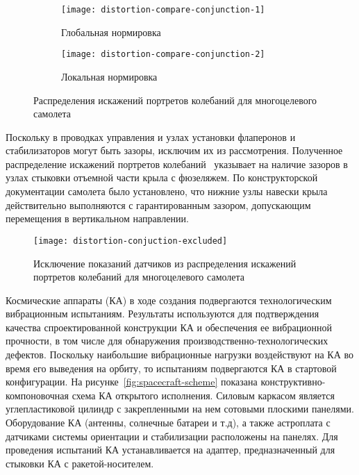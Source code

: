 \begin{figure}[!htb]
	\centerfloat
	\begin{subfigure}[t]{\sfDefects}
		\texttt{[image: distortion-compare-conjunction-1]} 
		\caption{Глобальная нормировка} \label{subfig:distortion-compare-conjunction-1}
	\end{subfigure}
	\hfill
	\begin{subfigure}[t]{\sfDefects}
		\texttt{[image: distortion-compare-conjunction-2]} 
		\caption{Локальная нормировка} \label{subfig:distortion-compare-conjunction-2}
	\end{subfigure}
    \caption{Распределения искажений портретов колебаний для многоцелевого самолета} \label{fig:distortion-compare-conjunction}
\end{figure}

Поскольку в проводках управления и узлах установки флаперонов и стабилизаторов могут быть зазоры, исключим их из рассмотрения. Полученное распределение искажений портретов колебаний~ указывает на наличие зазоров в узлах стыковки отъемной части крыла с фюзеляжем. По конструкторской документации самолета было установлено, что нижние узлы навески крыла действительно выполняются с гарантированным зазором, допускающим перемещения в вертикальном направлении.

\begin{figure}[!htb]
	\centerfloat
	\texttt{[image: distortion-conjuction-excluded]}
	\caption{Исключение показаний датчиков из распределения искажений портретов колебаний для многоцелевого самолета} \label{fig:distortion-conjunction-excluded}
\end{figure}

Космические аппараты (КА) в ходе создания подвергаются технологическим вибрационным испытаниям. Результаты используются для подтверждения качества спроектированной конструкции КА и обеспечения ее вибрационной прочности, в том числе для обнаружения производственно-технологических дефектов. Поскольку наибольшие вибрационные нагрузки воздействуют на КА во время его выведения на орбиту, то испытаниям подвергаются КА в стартовой конфигурации. На рисунке~\ref{fig:spacecraft-scheme} показана конструктивно-компоновочная схема КА открытого исполнения. Силовым каркасом является углепластиковой цилиндр с закрепленными на нем сотовыми плоскими панелями. Оборудование КА (антенны, солнечные батареи и т.д), а также астроплата с датчиками системы ориентации и стабилизации расположены на панелях. Для проведения испытаний КА устанавливается на адаптер, предназначенный для стыковки КА с ракетой-носителем.

